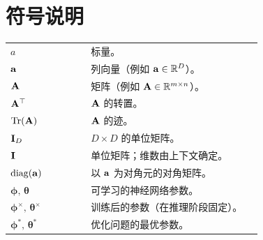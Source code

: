 \chapter*{符号说明}

\newcommand{\notationsection}[1]{%
  \vspace{1.2em}%
  \noindent{\textbfs{#1}}%
  \vspace{0.4em}%
  \par\nobreak
}

\newcommand{\notationtable}[1]{%
  \bgroup
  \def\arraystretch{1.25}%
  \noindent\begin{tabular}{@{}p{0.3\linewidth}@{\hspace{1.5em}}p{0.64\linewidth}@{}}
  #1
  \end{tabular}
  \egroup
}

\notationsection{数与数组}
\notationtable{
$a$                                       & 标量。\\
${\mathbf{a}}$                                    & 列向量（例如 ${\mathbf{a}}\in\mathbb{R}^D$）。\\
${\mathbf{A}}$                                    & 矩阵（例如 ${\mathbf{A}}\in\mathbb{R}^{m\times n}$）。\\
${\mathbf{A}}^\top$                               & ${\mathbf{A}}$ 的转置。\\
$\operatorname{Tr}({\mathbf{A}})$                               & ${\mathbf{A}}$ 的迹。\\
${\mathbf{I}}_D$                                  & $D\times D$ 的单位矩阵。\\
${\mathbf{I}}$                                    & 单位矩阵；维数由上下文确定。\\
$\mathrm{diag}({\mathbf{a}})$                     & 以 ${\mathbf{a}}$ 为对角元的对角矩阵。\\
$\bm{\phi},\,\bm{\theta}$                & 可学习的神经网络参数。\\
$\bm{\phi}^{\times},\,\bm{\theta}^{\times}$ & 训练后的参数（在推理阶段固定）。\\
$\bm{\phi}^{*},\,\bm{\theta}^{*}$        & 优化问题的最优参数。\\
}


